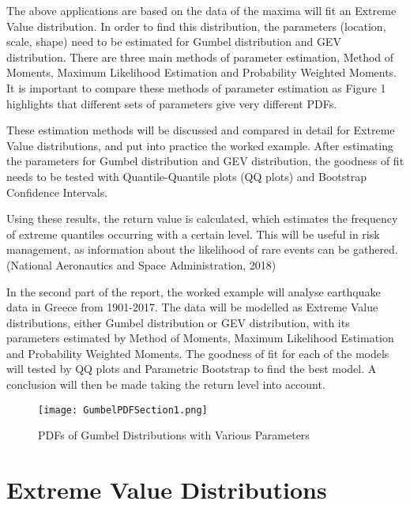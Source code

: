 \documentclass{article}
\begin{document}
The above applications are based on the data of the maxima will fit an Extreme Value distribution. In order to find this distribution, the parameters (location, scale, shape) need to be estimated for Gumbel distribution and GEV distribution. There are three main methods of parameter estimation, Method of Moments, Maximum Likelihood Estimation and Probability Weighted Moments. It is important to compare these methods of parameter estimation as Figure 1 highlights that different sets of parameters give very different PDFs.  

These estimation methods will be discussed and compared in detail for Extreme Value distributions, and put into practice the worked example. After estimating the parameters for Gumbel distribution and GEV distribution, the goodness of fit needs to be tested with Quantile-Quantile plots (QQ plots) and Bootstrap Confidence Intervals.

Using these results, the return value is calculated, which estimates the frequency of extreme quantiles occurring with a certain level. This will be useful in risk management, as information about the likelihood of rare events can be gathered. (National Aeronautics and Space Administration, 2018)

In the second part of the report, the worked example will analyse earthquake data in Greece
from 1901-2017. The data will be modelled as Extreme Value distributions, either Gumbel distribution
or GEV distribution, with its parameters estimated by Method of Moments, Maximum
Likelihood Estimation and Probability Weighted Moments. The goodness of fit for each of the
models will tested by QQ plots and Parametric Bootstrap to find the best model. A conclusion will then be made taking the return level into account.

\vspace{1cm}
\begin{figure}[h]
\begin{center}
\texttt{[image: GumbelPDFSection1.png]}
\caption{PDFs of Gumbel Distributions with Various Parameters}
\end{center}
\end{figure}



\newpage

\section{Extreme Value Distributions}
\end{document}
